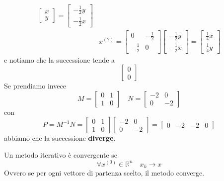 \begin{example}
\begin{equation*}
\begin{split}
\begin{bmatrix}
			x \\ y
			\end{bmatrix} = \begin{bmatrix}
			-\frac{1}{2} y \\ -\frac{1}{2} x
			\end{bmatrix} \\
			& x^{(2)} =  \begin{bmatrix}
				0 & -\frac{1}{2} \\ -\frac{1}{2} & 0
			\end{bmatrix} \begin{bmatrix}
				-\frac{1}{2}y \\ -\frac{1}{2}x
			\end{bmatrix} = \begin{bmatrix}
				\frac{1}{4} x \\ \frac{1}{4} y
			\end{bmatrix}
		\end{split}
	\end{equation*}
	e notiamo che la successione tende a 
	\begin{equation*}
		\begin{bmatrix}
			0 \\ 0
		\end{bmatrix}
	\end{equation*}
	Se prendiamo invece
	\begin{equation*}
		M=\begin{bmatrix}
			0 & 1 \\ 1 & 0
		\end{bmatrix} \quad
		N = \begin{bmatrix}
			-2 & 0 \\ 0 & -2
		\end{bmatrix}
	\end{equation*} con
	\begin{equation*}
		P = M^{-1}N = \begin{bmatrix}
			0 & 1 \\ 1 &0
		\end{bmatrix}\begin{bmatrix}
			-2 & 0 \\ 0 & -2
		\end{bmatrix} = \begin{bmatrix}
			0 &-2 & -2 & 0
		\end{bmatrix}
	\end{equation*}
	abbiamo che la successione \textbf{diverge}.
\end{example}
\begin{definition}
	Un metodo iterativo è convergente se
	\begin{equation}
		\forall x^{(0)} \in \mathbb{R}^n \quad x_k \to x
	\end{equation}
	Ovvero se per ogni vettore di partenza scelto, il metodo converge.
\end{definition}

